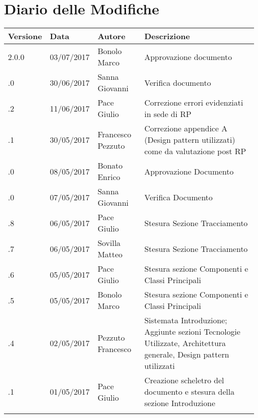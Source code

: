 \section*{Diario delle Modifiche}
\begin{longtabu} to \textwidth {
	X[4,l,p]
	X[4,l,p]
	X[4,l,p]
	X[8,l,p]}
	\toprule
		 Versione & Data & Autore & Descrizione \\
		\midrule
		\endhead
		2.0.0 & 03/07/2017 & Bonolo Marco & Approvazione documento\\
		\addlinespace[0.2em]
		\midrule
		.0 & 30/06/2017 & Sanna Giovanni & Verifica documento\\
		\addlinespace[0.2em]
		\midrule
		.2 & 11/06/2017 & Pace Giulio & Correzione errori evidenziati in sede di RP\\
		\addlinespace[0.2em]
		\midrule
		.1 & 30/05/2017 & Francesco Pezzuto & Correzione appendice A (Design pattern utilizzati) come da valutazione post RP\\
		\addlinespace[0.2em]
		\midrule
		.0 & 08/05/2017 & Bonato Enrico & Approvazione Documento\\
		\addlinespace[0.2em]
		\midrule
		.0 & 07/05/2017 & Sanna Giovanni & Verifica Documento\\
		\addlinespace[0.2em]
		\midrule
		.8 & 06/05/2017 & Pace Giulio & Stesura Sezione Tracciamento\\
		\addlinespace[0.2em]
		\midrule
		.7 & 06/05/2017 & Sovilla Matteo & Stesura Sezione Tracciamento\\
		\addlinespace[0.2em]
		\midrule
		.6 & 05/05/2017 & Pace Giulio & Stesura sezione Componenti e Classi Principali\\
		\addlinespace[0.2em]
		\midrule
		.5 & 05/05/2017 & Bonolo Marco & Stesura sezione Componenti e Classi Principali\\
		\addlinespace[0.2em]
		\midrule
		.4 & 02/05/2017 & Pezzuto Francesco & Sistemata Introduzione; Aggiunte sezioni Tecnologie Utilizzate, Architettura generale, Design pattern utilizzati\\
		\addlinespace[0.2em]
		\midrule
		.1 & 01/05/2017 & Pace Giulio & Creazione scheletro del documento e stesura della sezione Introduzione\\
		\addlinespace[0.4em]
		
	\bottomrule
\end{longtabu}
